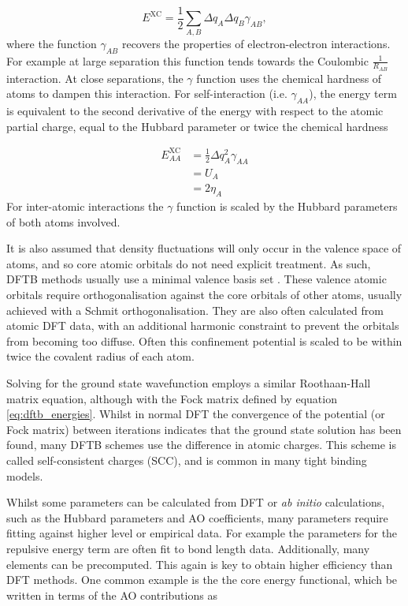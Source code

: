 \begin{equation}
    E^{\text{XC}} = \frac{1}{2}\sum_{A,B} \Delta q_A \Delta q_B \gamma_{AB},
    \label{eq:dftb_e_ex}
\end{equation}
%
where the function $\gamma_{AB}$ recovers the properties of electron-electron interactions.
For example at large separation this function tends towards the Coulombic $\frac{1}{R_{AB}}$
interaction. At close separations, the $\gamma$ function uses the chemical hardness 
of atoms to dampen this interaction. For self-interaction (i.e. $\gamma_{AA}$), 
the energy term is equivalent to the second derivative of the energy with respect
to the atomic partial charge, equal to the Hubbard parameter or twice the chemical
hardness 

\begin{equation}
    \begin{split}
    E^{\text{XC}}_{AA} &= \frac{1}{2} \Delta q_A^2 \gamma_{AA} \\
    &= U_{A} \\
    &= 2 \eta_A
    \end{split}
\end{equation}
%
For inter-atomic interactions the $\gamma$ function is scaled by the Hubbard parameters
of both atoms involved.

It is also assumed that density fluctuations will only occur in the valence space
of atoms, and so core atomic orbitals do not need explicit treatment. As such, DFTB
methods usually use a minimal valence basis set \cite{Bannwarth2020}. These valence
atomic orbitals require orthogonalisation against the core orbitals of other atoms,
usually achieved with a Schmit orthogonalisation. They are also often calculated
from atomic DFT data, with an additional harmonic constraint to prevent
the orbitals from becoming too diffuse. Often this confinement potential is scaled 
to be within twice the covalent radius of each atom.

Solving for the ground state wavefunction employs a similar Roothaan-Hall matrix
equation, although with the Fock matrix defined by equation \ref{eq:dftb_energies}.
Whilst in normal DFT the convergence of the potential (or Fock matrix) between iterations
indicates that the ground state solution has been found, many DFTB schemes use the
difference in atomic charges. This scheme is called self-consistent charges (SCC),
and is common in many tight binding models.

Whilst some parameters can be calculated from DFT or \emph{ab initio} calculations,
such as the Hubbard parameters and AO coefficients, many parameters require fitting
against higher level or empirical data. For example the parameters for the repulsive
energy term are often fit to bond length data. Additionally, many elements can be
precomputed. This again is key to obtain higher efficiency than DFT methods. One
common example is the the core energy functional, which be written in terms of the 
AO contributions as

